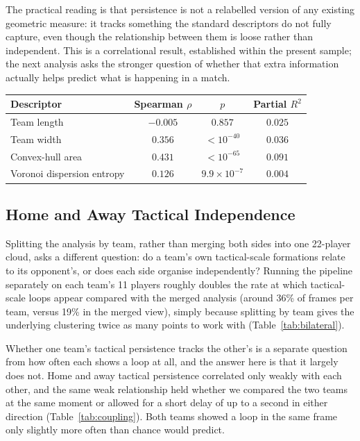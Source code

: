 The practical reading is that persistence is not a relabelled version
of any existing geometric measure: it tracks something the standard
descriptors do not fully capture, even though the relationship between
them is loose rather than independent. This is a correlational result,
established within the present sample; the next analysis asks the
stronger question of whether that extra information actually helps
predict what is happening in a match.

\begin{table}
{\begin{tabular}{lccc} \toprule
Descriptor & Spearman $\rho$ & $p$ & Partial $R^2$ \\ \midrule
Team length & $-0.005$ & $0.857$ & $0.025$ \\
Team width & $0.356$ & $<10^{-40}$ & $0.036$ \\
Convex-hull area & $0.431$ & $<10^{-65}$ & $0.091$ \\
Voronoi dispersion entropy & $0.126$ & $9.9\times10^{-7}$ & $0.004$ \\
\bottomrule
\end{tabular}}
\label{tab:baseline}
\end{table}

\subsection{Home and Away Tactical Independence}

Splitting the analysis by team, rather than merging both sides into one
22-player cloud, asks a different question: do a team's own
tactical-scale formations relate to its opponent's, or does each side
organise independently? Running the pipeline separately on each team's
11 players roughly doubles the rate at which tactical-scale loops
appear compared with the merged analysis (around 36\% of frames per
team, versus 19\% in the merged view), simply because splitting by team
gives the underlying clustering twice as many points to work with
(Table~\ref{tab:bilateral}).

Whether one team's tactical persistence tracks the other's is a
separate question from how often each shows a loop at all, and the
answer here is that it largely does not. Home and away tactical
persistence correlated only weakly with each other, and the same weak
relationship held whether we compared the two teams at the same moment
or allowed for a short delay of up to a second in either direction
(Table~\ref{tab:coupling}). Both teams showed a loop in the same frame
only slightly more often than chance would predict.

